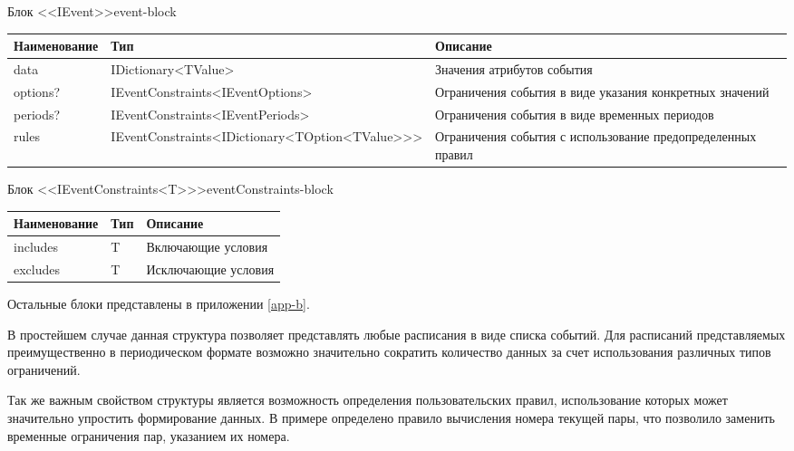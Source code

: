 \begin{tbl}{Блок <<IEvent>>}{event-block}
  \begin{tabularx}{\textwidth}{| p{3cm} | p{6cm} | X |}
  \hline Наименование & Тип                                                          & Описание                                                    \\
  \hline data         & IDictionary<TValue>                                          & Значения атрибутов события                                  \\
  \hline options?     & IEventConstraints<IEventOptions>                             & Ограничения события в виде указания конкретных значений     \\
  \hline periods?     & IEventConstraints<IEventPeriods>                             & Ограничения события в виде временных периодов               \\
  \hline rules        & IEventConstraints\newline <IDictionary<TOption<TValue>{}>{}> & Ограничения события с использование предопределенных правил \\
  \hline
  \end{tabularx}
\end{tbl}

\begin{tbl}{Блок <<IEventConstraints<T>{}>>}{eventConstraints-block}
  \begin{tabularx}{\textwidth}{| p{3cm} | p{3cm} | X |}
  \hline Наименование & Тип & Описание            \\
  \hline includes     & T   & Включающие условия  \\
  \hline excludes     & T   & Исключающие условия \\
  \hline
  \end{tabularx}
\end{tbl}

Остальные блоки представлены в приложении \ref{app-b}.

В простейшем случае данная структура позволяет представлять любые расписания в виде списка событий.
Для расписаний представляемых преимущественно в периодическом формате возможно значительно сократить количество данных за счет использования различных типов ограничений.

Так же важным свойством структуры является возможность определения пользовательских правил, использование которых может значительно упростить формирование данных.
В примере определено правило вычисления номера текущей пары, что позволило заменить временные ограничения пар, указанием их номера.

